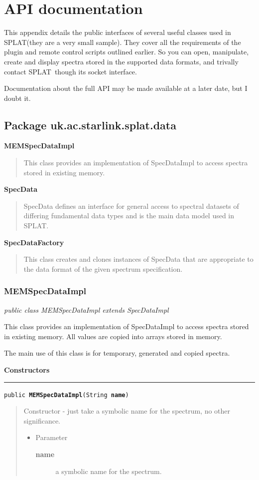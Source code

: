 \documentclass[twoside,11pt]{article}
\newcommand{\htmlref}[2]{#1}
\renewcommand{\_}{\texttt{\symbol{95}}}
\newcommand{\SPLAT}{\textsf{SPLAT}}
\newcommand{\entityintro}[3]{
  \htmlref{\textbf{\Large{#1}}}{#2}
  \dotfill\pageref{#2}
  \begin{quote}
  #3
  \end{quote}
}
\newcommand{\startsection}[4]{
   \subsubsection{\label{#3}{#2}}
   #4
}
\newcommand{\method}[1]{\texttt{#1}}
\newenvironment{desc}{\begin{quote}}{\end{quote}}
\newcommand{\constructors}{
   \par\textbf{\large{Constructors}}\\
   \hrule
}
\begin{document}
\newpage
\appendix

\section{API documentation\label{api_docs}}

This appendix details the public interfaces of several useful classes
used in \SPLAT (they are a very small sample). They cover all the
requirements of the plugin and remote control scripts outlined
earlier. So you can open, manipulate, create and display spectra
stored in the supported data formats, and trivally contact \SPLAT\
though its socket interface.

Documentation about the full API may be made available at a later
date, but I doubt it.

\subsection{Package uk.ac.starlink.splat.data}

\entityintro{MEMSpecDataImpl}{l0}{This class provides an
implementation of SpecDataImpl to access spectra stored in existing memory.}
\entityintro{SpecData}{l1}{SpecData defines an interface for general
access to spectral datasets of differing fundamental data types and is
the main data model used in SPLAT.}
\entityintro{SpecDataFactory}{l2}{This class creates and clones
instances of SpecData that are appropriate to the data format of the
given spectrum specification.} 
\clearpage
\startsection{Class}{MEMSpecDataImpl}{l0}
\fbox{\parbox{\textwidth}{
\textit{public class MEMSpecDataImpl extends SpecDataImpl}
}} %


{This class provides an implementation of SpecDataImpl to access
 spectra stored in existing memory. All values are copied into
 arrays stored in memory.

 The main use of this class is for temporary, generated and copied
 spectra.}
\constructors
\method{public \textbf{MEMSpecDataImpl}(\texttt{String} \textbf{name})\label{l3}\label{l4}}
\begin{desc}Constructor - just take a symbolic name for the spectrum, no
 other significance.
\begin{itemize}
\item{Parameter
  \begin{description}
   \item[\textbf{name}]{a symbolic name for the spectrum.}
  \end{description}}
\end{itemize}
\end{desc}
\end{document}
